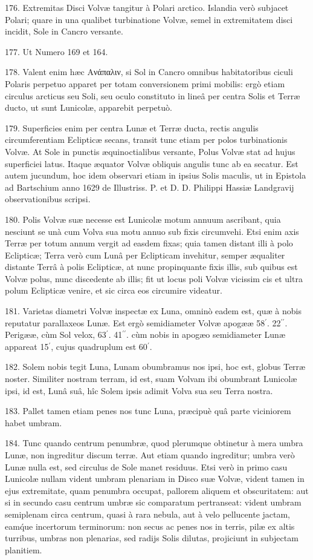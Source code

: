 \documentclass[a4paper, 11pt, oneside, polutonikogreek, german]{article}
\begin{document}
176. Extremitas Disci Volvæ tangitur à Polari arctico. Islandia verò subjacet Polari; quare in una qualibet turbinatione Volvæ, semel in extremitatem disci incidit, Sole in Cancro versante.

177. Ut Numero 169 et 164.

178. Valent enim hæc Ανάπαλιν, si Sol in Cancro omnibus habitatoribus ciculi Polaris perpetuo apparet per totam conversionem primi mobilis: ergò etiam circulus arcticus seu Soli, seu oculo constituto in lineâ per centra Solis et Terræ ducto, ut sunt Lunicolæ, apparebit perpetuò.

179. Superficies enim per centra Lunæ et Terræ ducta, rectis angulis circumferentiam Eclipticæ secans, transit tunc etiam per polos turbinationis Volvæ. At Sole in punctis æquinoctialibus versante, Polus Volvæ stat ad hujus superficiei latus. Itaque æquator Volvæ obliquis angulis tunc ab ea secatur. Est autem jucundum, hoc idem observari etiam in ipsius Solis maculis, ut in Epistola ad Bartschium anno 1629 de Illustriss. P. et D. D. Philippi Hassiæ Landgravij observationibus scripsi.

180. Polis Volvæ suæ necesse est Lunicolæ motum annuum ascribant, quia nesciunt se unà cum Volva sua motu annuo sub fixis circumvehi. Etsi enim axis Terræ per totum annum vergit ad easdem fixas; quia tamen distant illi à polo Eclipticæ; Terra verò cum Lunâ per Eclipticam invehitur, semper æqualiter distante Terrâ à polis Eclipticæ, at nunc propinquante fixis illis, sub quibus est Volvæ polus, nunc discedente ab illis; fit ut locus poli Volvæ vicissim cis et ultra polum Eclipticæ venire, et sic circa eos circumire videatur.

181. Varietas diametri Volvæ inspectæ ex Luna, omninò eadem est, quæ à nobis reputatur parallaxeos Lunæ. Est ergò semidiameter Volvæ apogææ 58$^{\prime}$. 22$^{\prime\prime}$. Perigææ, cùm Sol velox, 63$^{\prime}$. 41$^{\prime\prime}$. cùm nobis in apogæo semidiameter Lunæ appareat 15$^{\prime}$, cujus quadruplum est 60$^{\prime}$.

182. Solem nobis tegit Luna, Lunam obumbramus nos ipsi, hoc est, globus Terræ noster. Similiter nostram terram, id est, suam Volvam ibi obumbrant Lunicolæ ipsi, id est, Lunâ suâ, hîc Solem ipsis adimit Volva sua seu Terra nostra.

183. Pallet tamen etiam penes nos tunc Luna, præcipuè quâ parte viciniorem habet umbram.

184. Tunc quando centrum penumbræ, quod plerumque obtinetur à mera umbra Lunæ, non ingreditur discum terræ. Aut etiam quando ingreditur; umbra verò Lunæ nulla est, sed circulus de Sole manet residuus. Etsi verò in primo casu Lunicolæ nullam vident umbram plenariam in Disco suæ Volvæ, vident tamen in ejus extremitate, quam penumbra occupat, pallorem aliquem et obscuritatem: aut si in secundo casu centrum umbræ sic comparatum pertranseat: vident umbram semiplenam circa centrum, quasi à rara nebula, aut à velo pellucente jactam, eam\'que incertorum terminorum: non secus ac penes nos in terris, pilæ ex altis turribus, umbras non plenarias, sed radijs Solis dilutas, projiciunt in subjectam planitiem.
\end{document}
